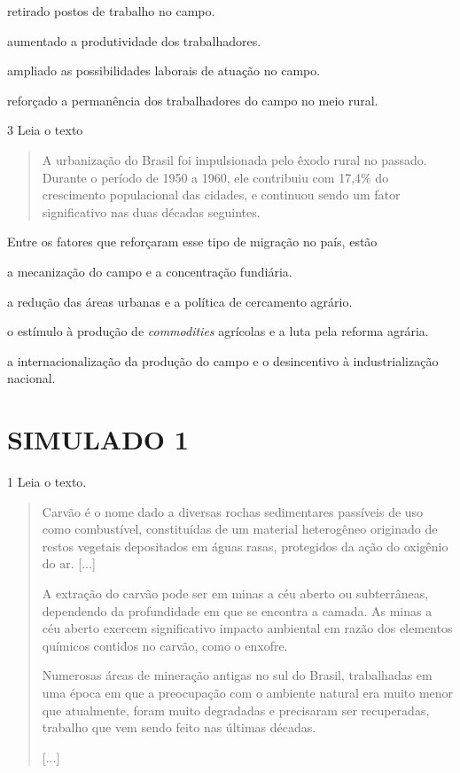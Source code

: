 \begin{escolha}
\item
  retirado postos de trabalho no campo.
\item
  aumentado a produtividade dos trabalhadores.
\item
  ampliado as possibilidades laborais de atuação no campo.
\item
  reforçado a permanência dos trabalhadores do campo no meio rural.
\end{escolha}

\num{3} Leia o texto

\begin{quote}
A urbanização do Brasil foi impulsionada pelo êxodo rural no passado.
Durante o período de 1950 a 1960, ele contribuiu com 17,4\% do
crescimento populacional das cidades, e continuou sendo um fator
significativo nas duas décadas seguintes.

\end{quote}

Entre os fatores que reforçaram esse tipo de migração no país, estão

\begin{escolha}
\item
  a mecanização do campo e a concentração fundiária.
\item
  a redução das áreas urbanas e a política de cercamento agrário.
\item
  o estímulo à produção de \emph{commodities} agrícolas e a luta pela
  reforma agrária.
\item
  a internacionalização da produção do campo e o desincentivo à
  industrialização nacional.
\end{escolha}


\chapter{SIMULADO 1}

\num{1} Leia o texto.

\begin{quote}
Carvão é o nome dado a diversas rochas sedimentares passíveis
de uso como combustível, constituídas de um material heterogêneo
originado de restos vegetais depositados em águas rasas, protegidos da
ação do oxigênio do ar. {[}...{]}

A extração do carvão pode ser em minas a céu aberto ou
subterrâneas, dependendo da profundidade em que se encontra a camada. As
minas a céu aberto exercem significativo impacto ambiental em razão dos
elementos químicos contidos no carvão, como o enxofre.

Numerosas áreas de mineração antigas no sul do Brasil, trabalhadas
em uma época em que a preocupação com o ambiente natural era muito menor
que atualmente, foram muito degradadas e precisaram ser recuperadas,
trabalho que vem sendo feito nas últimas décadas.

{[}...{]}

\end{quote}

